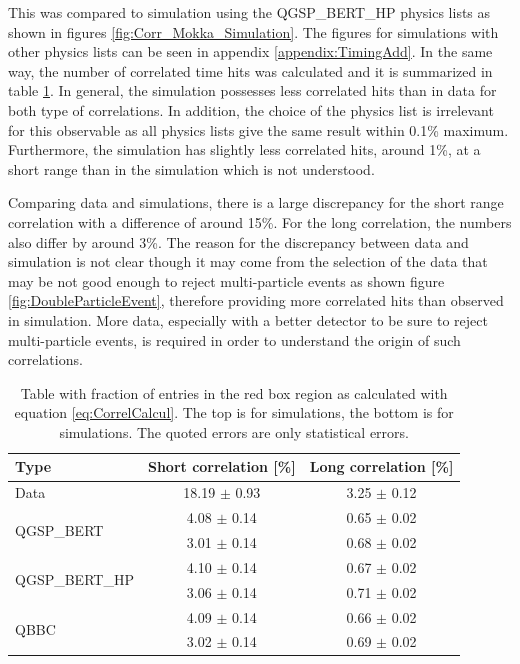This was compared to simulation using the QGSP\_BERT\_HP physics lists as shown in figures \ref{fig:Corr_Mokka_Simulation}. The figures for simulations with other physics lists can be seen in appendix \ref{appendix:TimingAdd}. In the same way, the number of correlated time hits was calculated and it is summarized in table \ref{table:Correlation_DataSim}. In general, the simulation possesses less correlated hits than in data for both type of correlations. In addition, the choice of the physics list is irrelevant for this observable as all physics lists give the same result within 0.1\% maximum. Furthermore, the \ddhep simulation has slightly less correlated hits, around 1\%, at a short range than in the \mokka simulation which is not understood.

Comparing data and simulations, there is a large discrepancy for the short range correlation with a difference of around 15\%. For the long correlation, the numbers also differ by around 3\%. The reason for the discrepancy between data and simulation is not clear though it may come from the selection of the data that may be not good enough to reject multi-particle events as shown figure \ref{fig:DoubleParticleEvent}, therefore providing more correlated hits than observed in simulation. More data, especially with a better detector to be sure to reject multi-particle events, is required in order to understand the origin of such correlations.

\begin{table}[htb!]
	\centering
	\caption{Table with fraction of entries in the red box region as calculated with equation \ref{eq:CorrelCalcul}. The top is for \mokka simulations, the bottom is for \ddhep simulations. The quoted errors are only statistical errors.}
	\label{table:Correlation_DataSim}
	\begin{tabular}{@{} lcc @{}}
		\toprule
		Type & Short correlation [\%] & Long correlation [\%]\\
		\midrule
		\multirow{2}{*}{Data} & \multirow{2}{*}{18.19 $\pm$ 0.93} & \multirow{2}{*}{3.25 $\pm$ 0.12}\\ & &\\
		\midrule
		\multirow{2}{*}{QGSP\_BERT} & 4.08 $\pm$ 0.14 & 0.65 $\pm$ 0.02\\ & 3.01 $\pm$ 0.14 & 0.68 $\pm$ 0.02\\
		\multirow{2}{*}{QGSP\_BERT\_HP} & 4.10 $\pm$ 0.14 & 0.67 $\pm$ 0.02\\ & 3.06 $\pm$ 0.14 & 0.71 $\pm$ 0.02\\
		\multirow{2}{*}{QBBC} & 4.09 $\pm$ 0.14 & 0.66 $\pm$ 0.02\\ & 3.02 $\pm$ 0.14 & 0.69 $\pm$ 0.02\\
		\bottomrule
	\end{tabular}
\end{table}


